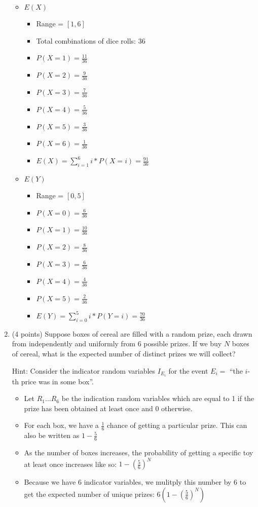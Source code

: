 \documentclass[11pt]{article}
\begin{document}
\begin{enumerate}
\begin{itemize}
	\item $E(X)$
	\begin{itemize}
		\item Range = $[1, 6]$
		\item Total combinations of dice rolls: 36
		\item $P(X=1) = \frac{11}{36}$
		\item $P(X=2) = \frac{9}{36}$
		\item $P(X=3) = \frac{7}{36}$
		\item $P(X=4) = \frac{5}{36}$
		\item $P(X=5) = \frac{3}{36}$
		\item $P(X=6) = \frac{1}{36}$
		\item $E(X) = \displaystyle\sum\limits_{i=1}^6 i*P(X=i) = \frac{91}{36}$
	\end{itemize}
	\item $E(Y)$
	\begin{itemize}
		\item Range = $[0, 5]$
		\item $P(X=0) = \frac{6}{36}$
		\item $P(X=1) = \frac{10}{36}$
		\item $P(X=2) = \frac{8}{36}$
		\item $P(X=3) = \frac{6}{36}$
		\item $P(X=4) = \frac{4}{36}$
		\item $P(X=5) = \frac{2}{36}$
		\item $E(Y) = \displaystyle\sum\limits_{i=0}^5 i*P(Y=i) = \frac{70}{36}$
	\end{itemize}
\end{itemize}

\item (4 points) Suppose boxes of cereal are filled with a random prize,
each drawn from independently and uniformly from $6$ possible prizes.
If we buy $N$ boxes of cereal, what is the expected number of distinct
prizes we will collect? \begin{small}\textsf{Hint: Consider the indicator
random variables $I_{E_i}$ for the event $E_i =$ ``the $i$-th price was
in some box''.}\end{small}

\begin{itemize}
	\item Let $R_{1}...R_{6}$ be the indication random variables which are equal
	to 1 if the prize has been obtained at least once and 0 otherwise.
	\item For each box, we have a $\frac{1}{6}$ chance of getting a particular
	prize. This can also be written as $1 - \frac{5}{6}$
	\item As the number of boxes increases, the probability of getting a 
	specific toy at least once increases like so: $1 - (\frac{5}{6})^{N}$
	\item Because we have 6 indicator variables, we mulitply this number by
	6 to get the expected number of unique prizes: $6(1-(\frac{5}{6})^{N})$
\end{itemize}


\end{enumerate}
\end{document}
